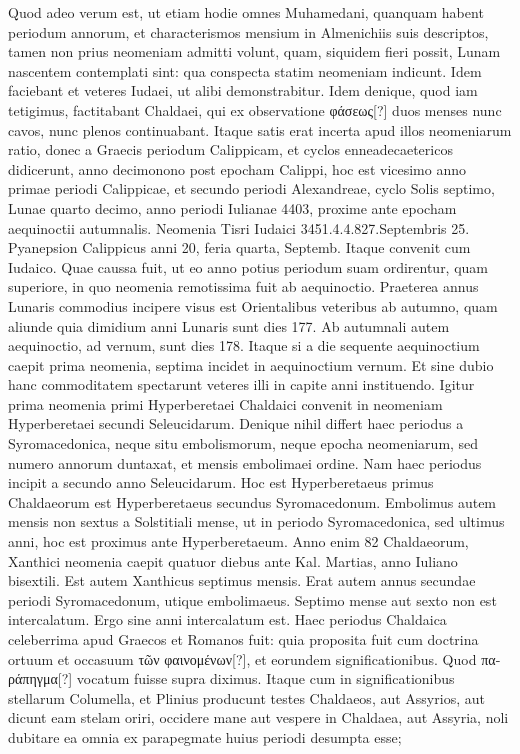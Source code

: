 Quod adeo verum est, ut etiam hodie omnes Muhamedani, quanquam
habent periodum annorum, et characterismos mensium in Almenichiis
suis descriptos, tamen non prius neomeniam admitti volunt,
quam, siquidem fieri possit, Lunam nascentem contemplati sint: qua
conspecta statim neomeniam indicunt.
Idem faciebant et veteres Iudaei,
ut alibi demonstrabitur.
Idem denique, quod iam tetigimus, factitabant
Chaldaei, qui ex observatione \textgreek{φάσεως[?]} duos menses nunc cavos,
nunc plenos continuabant.
Itaque satis erat incerta apud illos neomeniarum
ratio, donec a Graecis periodum Calippicam, et cyclos
enneadecaetericos didicerunt, anno decimonono post epocham Calippi,
hoc est vicesimo anno primae periodi Calippicae, et secundo periodi
Alexandreae, cyclo Solis septimo, Lunae quarto decimo, anno periodi
Iulianae 4403, proxime ante epocham aequinoctii autumnalis.
Neomenia
Tisri Iudaici 3451.4.4.827.Septembris 25.
Pyanepsion Calippicus
anni 20, feria quarta,  Septemb. %
Itaque convenit cum Iudaico.
Quae caussa fuit, ut eo anno potius periodum suam ordirentur,
quam superiore, in quo neomenia remotissima fuit ab aequinoctio.
Praeterea annus Lunaris commodius incipere visus est Orientalibus
veteribus ab autumno, quam aliunde quia dimidium anni Lunaris
sunt dies 177.
Ab autumnali autem aequinoctio, ad vernum, sunt dies
178.
Itaque si a die sequente aequinoctium caepit prima neomenia, septima
incidet in aequinoctium vernum.
Et sine dubio hanc commoditatem
spectarunt veteres illi in capite anni instituendo.
Igitur prima
neomenia primi Hyperberetaei Chaldaici convenit in neomeniam
Hyperberetaei secundi Seleucidarum.
Denique nihil differt haec periodus
a Syromacedonica, neque situ embolismorum, neque epocha
neomeniarum, sed numero annorum duntaxat, et mensis embolimaei
ordine.
Nam haec periodus incipit a secundo anno Seleucidarum.
Hoc est Hyperberetaeus primus Chaldaeorum est Hyperberetaeus secundus
Syromacedonum.
Embolimus autem mensis non sextus a
Solstitiali mense, ut in periodo Syromacedonica, sed ultimus anni, hoc
est proximus ante Hyperberetaeum.
Anno enim 82 Chaldaeorum,
Xanthici neomenia caepit quatuor diebus ante Kal. %
 Martias, anno
Iuliano bisextili.
Est autem Xanthicus septimus mensis.
Erat autem
annus  secundae periodi Syromacedonum, utique embolimaeus.
Septimo mense aut sexto non est intercalatum.
Ergo sine anni intercalatum
est.
Haec periodus Chaldaica celeberrima apud Graecos et
Romanos fuit: quia proposita fuit cum doctrina ortuum et occasuum
\textgreek{τῶν φαινομένων[?]}, et eorundem significationibus.
Quod \textgreek{παράπηγμα[?]}
vocatum fuisse supra diximus.
Itaque cum in significationibus stellarum
Columella, et Plinius producunt testes Chaldaeos, aut Assyrios,
aut dicunt eam stelam oriri, occidere mane aut vespere in Chaldaea,
aut Assyria, noli dubitare ea omnia ex parapegmate huius periodi
desumpta esse;
\begin{table}[htbp]
 
\end{table}

